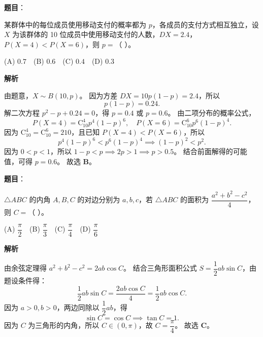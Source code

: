 \begin{answer}

\textbf{题目}：

某群体中的每位成员使用移动支付的概率都为 $p$，各成员的支付方式相互独立，设 $X$ 为该群体的 10 位成员中使用移动支付的人数，$DX = 2.4$，$P(X = 4) < P(X = 6)$，则 $p =$（ ）。

(A) $0.7$　(B) $0.6$　(C) $0.4$　(D) $0.3$

\textbf{解析}

由题意，$X \sim B(10, p)$。
因为方差 $DX = 10p(1 - p) = 2.4$，所以
\nopagebreak[4]
\[p(1 - p) = 0.24.\]
解二次方程 $p^2 - p + 0.24 = 0$，得 $p = 0.4$ 或 $p = 0.6$。
由二项分布的概率公式，
\nopagebreak[4]
\[P(X = 4) = \mathrm C_{10}^4 p^4 (1 - p)^6, \quad P(X = 6) = \mathrm C_{10}^6 p^6 (1 - p)^4.\]
因为 $\mathrm C_{10}^4 = \mathrm C_{10}^6 = 210$，且已知 $P(X = 4) < P(X = 6)$，所以
\nopagebreak[4]
\[p^4 (1 - p)^6 < p^6 (1 - p)^4 \implies (1 - p)^2 < p^2.\]
因为 $0 < p < 1$，所以 $1 - p < p \implies 2p > 1 \implies p > 0.5$。
结合前面解得的可能值，可得 $p = 0.6$。
故选 \textbf{B}。


\end{answer}
\begin{answer}

\textbf{题目}：

$\triangle ABC$ 的内角 $A, B, C$ 的对边分别为 $a, b, c$，若 $\triangle ABC$ 的面积为 $\dfrac{a^2 + b^2 - c^2}{4}$，则 $C =$（ ）。

(A) $\dfrac\pi2$　(B) $\dfrac\pi3$　(C) $\dfrac\pi4$　(D) $\dfrac\pi6$

\textbf{解析}

由余弦定理得 $a^2 + b^2 - c^2 = 2ab\cos C$。
结合三角形面积公式 $S = \dfrac12 ab\sin C$，由题设条件得：
\nopagebreak[4]
\[\dfrac12 ab\sin C = \dfrac{2ab\cos C}{4} = \dfrac12 ab\cos C.\]
因为 $a > 0, b > 0$，两边同除以 $\dfrac12 ab$，得
\nopagebreak[4]
\[\sin C = \cos C \implies \tan C = 1.\]
因为 $C$ 为三角形的内角，所以 $C \in (0, \pi)$，故 $C = \dfrac\pi4$。
故选 \textbf{C}。


\end{answer}

